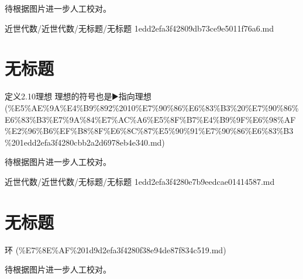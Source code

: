 \begin{note}[无标题]

待根据图片进一步人工校对。

\end{note}

\begin{note}[来源路径]

近世代数/近世代数/无标题/无标题 1edd2efa3f42809db73ce9e5011f76a6.md

\end{note}

\section*{无标题}

\begin{note}[来源上级主题]

定义2.10理想 理想的符号也是▶️指向理想 (\%E5\%AE\%9A\%E4\%B9\%892\%2010\%E7\%90\%86\%E6\%83\%B3\%20\%E7\%90\%86\%E6\%83\%B3\%E7\%9A\%84\%E7\%AC\%A6\%E5\%8F\%B7\%E4\%B9\%9F\%E6\%98\%AF\%E2\%96\%B6\%EF\%B8\%8F\%E6\%8C\%87\%E5\%90\%91\%E7\%90\%86\%E6\%83\%B3\%201edd2efa3f4280cbb2a2d6978eb4e340.md)

\end{note}

\begin{note}[无标题]

待根据图片进一步人工校对。

\end{note}

\begin{note}[来源路径]

近世代数/近世代数/无标题/无标题 1edd2efa3f4280e7b9eedcae01414587.md

\end{note}

\section*{无标题}

\begin{note}[来源上级主题]

环 (\%E7\%8E\%AF\%201d9d2efa3f4280f38e94de87f834c519.md)

\end{note}

\begin{note}[无标题]

待根据图片进一步人工校对。

\end{note}

